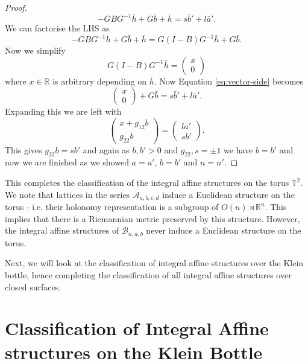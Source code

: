 \begin{proof}
    \begin{equation}
        \label{eq:vector-side}
        -GBG^{-1}\bar{h} + G\bar{b} + \bar{h} = s\bar{b}' + l\bar{a}'.
    \end{equation}
    We can factorise the LHS as
    $$
        -GBG^{-1}h + G\bar{b} + \bar{h}  = G(I- B)G^{-1}\bar{h} + G\bar{b}.
    $$
    Now we simplify
    $$
        G(I- B)G^{-1}\bar{h} = \begin{pmatrix}
            x \\ 0
        \end{pmatrix}
    $$
    where $x \in \mathbb{R}$ is arbitrary depending on $\bar{h}$. Now Equation \ref{eq:vector-side} becomes
    $$
        \begin{pmatrix}
            x \\ 0
        \end{pmatrix} + G \bar{b} = s\bar{b}' + l\bar{a}'.
    $$
    Expanding this we are left with
    $$
        \begin{pmatrix}
            x + g_{12}b \\
            g_{22}b
        \end{pmatrix} = \begin{pmatrix}
            la' \\
            sb'
        \end{pmatrix}.
    $$
    This gives $g_{22}b = sb'$ and again as $b, b'>0$ and $g_{22}, s = \pm 1$ we have $b = b'$ and now we are finished as we showed $a=a'$, $b=b'$ and $n=n'$.

\end{proof}

This completes the classification of the integral affine structures on the
torus $\mathbb{T}^2$. We note that lattices in the series
$\mathcal{A}_{a,b,c,d}$ induce a Euclidean structure on the torus - i.e. their
holonomy representation is a subgroup of $O(n) \rtimes \mathbb{R}^n$. This
implies that there is a Riemannian metric preserved by this structure. However,
the integral affine structures of $\mathcal{B}_{n,a,b}$ never induce a
Euclidean structure on the torus.

Next, we will look at the classification of integral affine structures over the
Klein bottle, hence completing the classification of all integral affine
structures over closed surfaces.

\newpage
\section{Classification of Integral Affine structures on the Klein Bottle}
